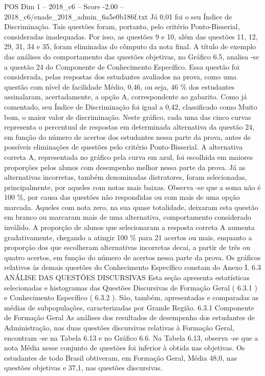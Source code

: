 \begin{textsample}{POS Dim 1 – 2018\_c6 – Score -2.00 – 2018\_c6/enade\_2018\_admin\_6a5e0b186f.txt}
Já 0,01 foi o seu Índice de Discriminação.
Tais questões foram, portanto, pelo critério Ponto-Bisserial, consideradas inadequadas.
Por isso, as questões 9 e 10, além das questões 11, 12, 29, 31, 34 e 35, foram eliminadas do cômputo da nota final.
A título de exemplo das análises do comportamento das questões objetivas, no Gráfico 6.5, analisa -se a questão 24 do Componente de Conhecimento Específico.
Essa questão foi considerada, pelas respostas dos estudantes avaliados na prova, como uma questão com nível de facilidade Médio, 0,46, ou seja, 46 \% dos estudantes assinalaram, acertadamente, a opção A, correspondente ao gabarito.
Como já comentado, seu Índice de Discriminação foi igual a 0,42, classificado como Muito bom, o maior valor de discriminação.
Neste gráfico, cada uma das cinco curvas representa o percentual de respostas em determinada alternativa da questão 24, em função do número de acertos dos estudantes nessa parte da prova, antes de possíveis eliminações de questões pelo critério Ponto-Bisserial.
A alternativa correta A, representada no gráfico pela curva em azul, foi escolhida em maiores proporções pelos alunos com desempenho melhor nessa parte da prova.
Já as alternativas incorretas, também denominadas distratores, foram selecionadas, principalmente, por aqueles com notas mais baixas.
Observa -se que a soma não é 100 \%, por causa das questões não respondidas ou com mais de uma opção marcada.
Aqueles com nota zero, na sua quase totalidade, deixaram esta questão em branco ou marcaram mais de uma alternativa, comportamento considerado inválido.
A proporção de alunos que selecionaram a resposta correta A aumenta gradativamente, chegando a atingir 100 \% para 21 acertos ou mais, enquanto a proporção dos que escolheram alternativas incorretas decai, a partir de três ou quatro acertos, em função do número de acertos nessa parte da prova.
Os gráficos relativos às demais questões do Conhecimento Específico constam do Anexo I. 6.3 ANÁLISE DAS QUESTÕES DISCURSIVAS Esta seção apresenta estatísticas selecionadas e histogramas das Questões Discursivas de Formação Geral ( 6.3.1 ) e Conhecimento Específico ( 6.3.2 ).
São, também, apresentadas e comparadas as médias de subpopulações, caracterizadas por Grande Região. 6.3.1 Componente de Formação Geral As análises dos resultados de desempenho dos estudantes de Administração, nas duas questões discursivas relativas à Formação Geral, encontram -se na Tabela 6.13 e no Gráfico 6.6.
Na Tabela 6.13, observa -se que a nota Média nesse conjunto de questões foi inferior à obtida nas objetivas.
Os estudantes de todo Brasil obtiveram, em Formação Geral, Média 48,0, nas questões objetivas e 37,1, nas questões discursivas.

\end{textsample}

